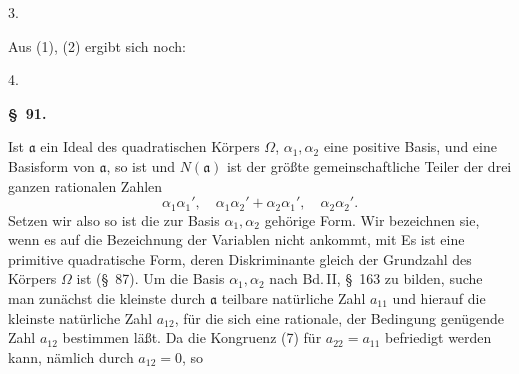 
3. 

Aus (1), (2) ergibt sich noch:

4. 

\textbf{\S\ 91. }

Ist $\mathfrak{a}$ ein Ideal des quadratischen K\"orpers $\Omega$, $\alpha_1, \alpha_2$ eine
positive Basis, und
eine Basisform von $\mathfrak{a}$, so ist
und $N(\mathfrak{a})$ ist der gr\"o\ss te gemeinschaftliche Teiler der drei ganzen
rationalen Zahlen
\[
\alpha_1\alpha_1', \quad \alpha_1\alpha_2'+\alpha_2\alpha_1', \quad \alpha_2\alpha_2'.
\]
Setzen wir also
so ist
die zur Basis $\alpha_1, \alpha_2$ geh\"orige Form. Wir bezeichnen sie, wenn
es auf die Bezeichnung der Variablen nicht ankommt, mit
Es ist eine primitive quadratische Form, deren Diskriminante
gleich der Grundzahl des K\"orpers $\Omega$ ist (\S\ 87). Um die Basis
$\alpha_1, \alpha_2$ nach Bd.\,II, \S\ 163 zu bilden, suche man zun\"achst die kleinste
durch $\mathfrak{a}$ teilbare nat\"urliche Zahl $a_{11}$ und hierauf die kleinste
nat\"urliche Zahl $a_{12}$, f\"ur die sich eine rationale, der Bedingung
gen\"ugende Zahl $a_{12}$ bestimmen %
 l\"a\ss t. Da die Kongruenz (7) f\"ur
$a_{22}=a_{11}$ befriedigt werden kann, n\"amlich durch $a_{12}=0$, so
